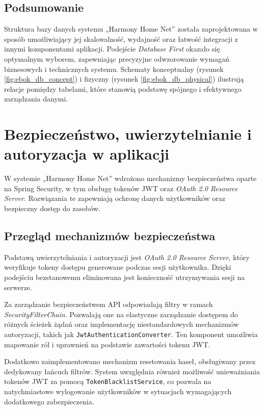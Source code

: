 \subsection{Podsumowanie}

Struktura bazy danych systemu „Harmony Home Net” została zaprojektowana w sposób umożliwiający jej skalowalność, wydajność oraz łatwość integracji z innymi komponentami aplikacji. Podejście \emph{Database First} okazało się optymalnym wyborem, zapewniając precyzyjne odwzorowanie wymagań biznesowych i technicznych systemu. Schematy konceptualny (rysunek \ref{fig:ebok_db_concept}) i fizyczny (rysunek \ref{fig:ebok_db_physical}) ilustrują relacje pomiędzy tabelami, które stanowią podstawę spójnego i efektywnego zarządzania danymi.

\section{Bezpieczeństwo, uwierzytelnianie i autoryzacja w aplikacji}

W systemie „Harmony Home Net” wdrożono mechanizmy bezpieczeństwa oparte na Spring Security, w tym obsługę tokenów JWT oraz \emph{OAuth 2.0 Resource Server}. Rozwiązania te zapewniają ochronę danych użytkowników oraz bezpieczny dostęp do zasobów.

\subsection{Przegląd mechanizmów bezpieczeństwa}

Podstawą uwierzytelniania i autoryzacji jest \emph{OAuth 2.0 Resource Server}, który weryfikuje tokeny dostępu generowane podczas sesji użytkownika. Dzięki podejściu bezstanowemu eliminowana jest konieczność utrzymywania sesji na serwerze. 

Za zarządzanie bezpieczeństwem API odpowiadają filtry w ramach \emph{SecurityFilterChain}. Pozwalają one na elastyczne zarządzanie dostępem do różnych ścieżek żądań oraz implementację niestandardowych mechanizmów autoryzacji, takich jak \texttt{JwtAuthenticationConverter}. Ten komponent umożliwia mapowanie ról i uprawnień na podstawie zawartości tokenu JWT.

Dodatkowo zaimplementowano mechanizm resetowania haseł, obsługiwany przez dedykowany łańcuch filtrów. System uwzględnia również możliwość unieważniania tokenów JWT za pomocą \texttt{TokenBlacklistService}, co pozwala na natychmiastowe wylogowanie użytkowników w sytuacjach wymagających dodatkowego zabezpieczenia.

